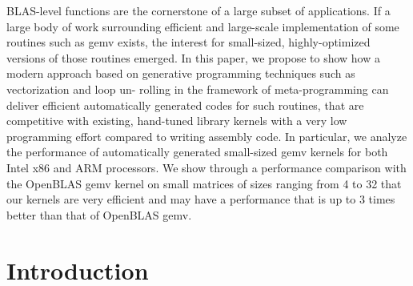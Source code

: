 \documentclass[../../main.tex]{subfiles}
\begin{document}
BLAS-level functions are the cornerstone of a large
subset of applications. If a large body of work surrounding
efficient and large-scale implementation of some routines such
as gemv exists, the interest for small-sized, highly-optimized
versions of those routines emerged. In this paper, we propose
to show how a modern \cpp approach based on generative
programming techniques such as vectorization and loop un-
rolling in the framework of meta-programming can deliver
efficient automatically generated codes for such routines, that
are competitive with existing, hand-tuned library kernels with
a very low programming effort compared to writing assembly
code. In particular, we analyze the performance of automatically
generated small-sized gemv kernels for both Intel x86 and ARM
processors. We show through a performance comparison with
the OpenBLAS gemv kernel on small matrices of sizes ranging
from 4 to 32 that our \cpp kernels are very efficient and may
have a performance that is up to 3 times better than that of
OpenBLAS gemv.

\section{Introduction}
\end{document}
